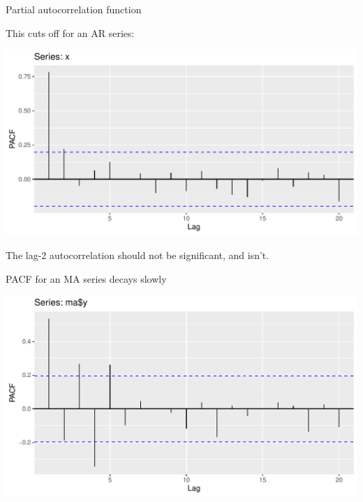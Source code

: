 \documentclass[ignorenonframetext,]{beamer}
\newenvironment{Shaded}{\begin{snugshade}}{\end{snugshade}}
\newcommand{\DataTypeTok}[1]{\textcolor[rgb]{0.13,0.29,0.53}{#1}}
\newcommand{\KeywordTok}[1]{\textcolor[rgb]{0.13,0.29,0.53}{\textbf{#1}}}
\newcommand{\NormalTok}[1]{#1}
\newcommand{\OperatorTok}[1]{\textcolor[rgb]{0.81,0.36,0.00}{\textbf{#1}}}
\newcommand{\StringTok}[1]{\textcolor[rgb]{0.31,0.60,0.02}{#1}}
\begin{document}
\begin{frame}[fragile]{Partial autocorrelation function}
\protect\hypertarget{partial-autocorrelation-function}{}

This cuts off for an AR series:

\begin{Shaded}
\end{Shaded}

\includegraphics{figure/unnamed-chunk-554-1.pdf}

The lag-2 autocorrelation should not be significant, and isn't.

\end{frame}

\begin{frame}[fragile]{PACF for an MA series decays slowly}
\protect\hypertarget{pacf-for-an-ma-series-decays-slowly}{}

\begin{Shaded}
\end{Shaded}

\includegraphics{figure/unnamed-chunk-555-1.pdf}

\end{frame}
\end{document}
